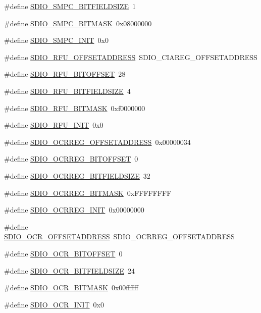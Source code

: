 \begin{DoxyCompactItemize}
\item 
\#define \hyperlink{a00571_a062d1709d40ff53b6fa7672dd6e12832}{SDIO\_\-SMPC\_\-BITFIELDSIZE}~1
\item 
\#define \hyperlink{a00571_a0ec6bbeb04710d979fb4166046b9a3df}{SDIO\_\-SMPC\_\-BITMASK}~0x08000000
\item 
\#define \hyperlink{a00571_aee30b6caab7b4c152c5682e1fe2f9b6d}{SDIO\_\-SMPC\_\-INIT}~0x0
\item 
\#define \hyperlink{a00571_ab00e7cb4c2222efa298980139ba77a2e}{SDIO\_\-RFU\_\-OFFSETADDRESS}~SDIO\_\-CIAREG\_\-OFFSETADDRESS
\item 
\#define \hyperlink{a00571_a8960529b26218fc984c308bf945f24ca}{SDIO\_\-RFU\_\-BITOFFSET}~28
\item 
\#define \hyperlink{a00571_aede702162461d94be59f4a8866df4ec0}{SDIO\_\-RFU\_\-BITFIELDSIZE}~4
\item 
\#define \hyperlink{a00571_a17c1c637ac34d8ffe8e89a9831f4b377}{SDIO\_\-RFU\_\-BITMASK}~0xf0000000
\item 
\#define \hyperlink{a00571_a8f99a3425accb1c048f183b884c95223}{SDIO\_\-RFU\_\-INIT}~0x0
\item 
\#define \hyperlink{a00571_a818124b14083677b8d618686288da9bb}{SDIO\_\-OCRREG\_\-OFFSETADDRESS}~0x00000034
\item 
\#define \hyperlink{a00571_a0c61121f7f58f9f4ec70fe2c0bcd5718}{SDIO\_\-OCRREG\_\-BITOFFSET}~0
\item 
\#define \hyperlink{a00571_a4c04be04e1f65a2dde1b0abe254751e8}{SDIO\_\-OCRREG\_\-BITFIELDSIZE}~32
\item 
\#define \hyperlink{a00571_a7dd4f3efbe16eae653362abdfc20b6e7}{SDIO\_\-OCRREG\_\-BITMASK}~0xFFFFFFFF
\item 
\#define \hyperlink{a00571_ae4bf4feaeefa4683a606622e68b93101}{SDIO\_\-OCRREG\_\-INIT}~0x00000000
\item 
\#define \hyperlink{a00571_acff4cc256bb3b00842b2e6771d204c54}{SDIO\_\-OCR\_\-OFFSETADDRESS}~SDIO\_\-OCRREG\_\-OFFSETADDRESS
\item 
\#define \hyperlink{a00571_ab96c901f41a759cc8e1d2a5e24a80485}{SDIO\_\-OCR\_\-BITOFFSET}~0
\item 
\#define \hyperlink{a00571_a2ef8d744dcd037de9518ae7bb21c95d7}{SDIO\_\-OCR\_\-BITFIELDSIZE}~24
\item 
\#define \hyperlink{a00571_aad3ea1df3a10c401dcc96eaba7bfdb50}{SDIO\_\-OCR\_\-BITMASK}~0x00ffffff
\item 
\#define \hyperlink{a00571_a932b8cf13b0312b2062fd78475421658}{SDIO\_\-OCR\_\-INIT}~0x0

\end{DoxyCompactItemize}
